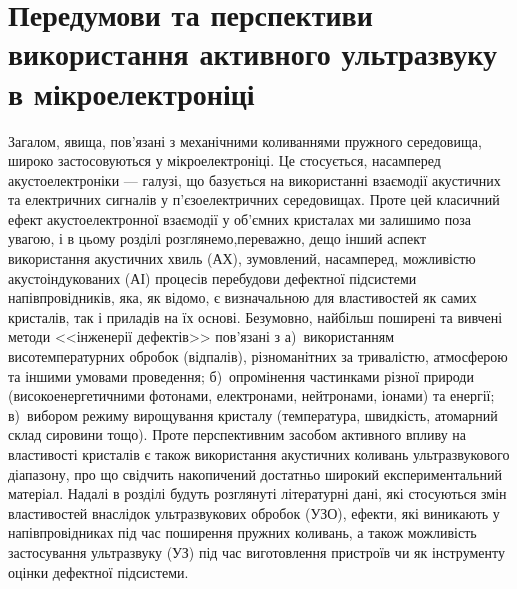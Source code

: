 \chapter{Передумови та перспективи використання активного ультразвуку в мікроелектроніці\label{Oglyad}}


Загалом, явища, пов'язані з механічними коливаннями пружного середовища, широко застосовуються у мікроелектроніці.
Це стосується, насамперед акустоелектроніки --- галузі, що базується на використанні взаємодії акустичних та електричних сигналів у п'єзоелектричних середовищах.
Проте цей класичний ефект акустоелектронної взаємодії у об'ємних кристалах ми залишимо поза увагою, і в цьому розділі
розглянемо,переважно, дещо інший аспект використання акустичних хвиль (АХ),
зумовлений, насамперед, можливістю акустоіндукованих (АІ) процесів перебудови дефектної підсистеми напівпровідників, яка, як відомо, є визначальною для властивостей як самих кристалів, так і приладів на їх основі.
Безумовно, найбільш поширені та вивчені методи <<інженерії дефектів>> пов'язані з
а)~використанням висотемпературних обробок (відпалів), різноманітних за тривалістю, атмосферою та іншими умовами проведення;
б)~опромінення частинками різної природи (високоенергетичними фотонами, електронами, нейтронами, іонами) та енергії;
в)~вибором режиму вирощування кристалу (температура, швидкість, атомарний склад сировини тощо).
Проте перспективним засобом активного впливу на властивості кристалів є також використання акустичних коливань ультразвукового діапазону, про що свідчить накопичений достатньо широкий експериментальний матеріал.
Надалі в розділі будуть розглянуті літературні дані, які стосуються змін властивостей внаслідок ультразвукових обробок (УЗО), ефекти, які виникають у напівпровідниках під час поширення пружних коливань,
а також можливість застосування ультразвуку (УЗ) під час виготовлення пристроїв чи як інструменту оцінки дефектної підсистеми.

